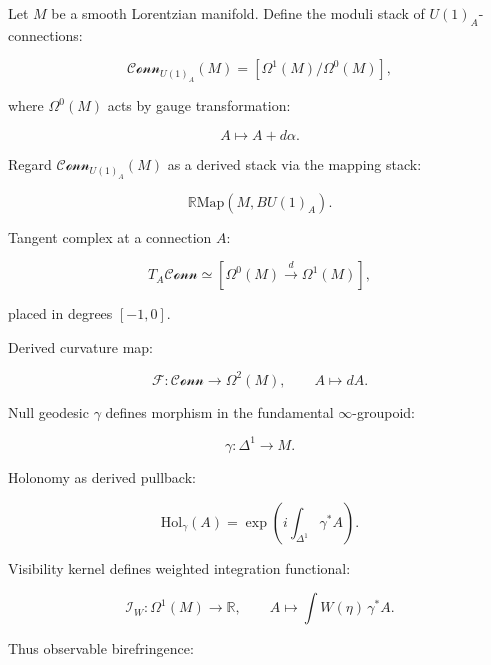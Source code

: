 \documentclass[12pt]{article}
\begin{document}
Let $M$ be a smooth Lorentzian manifold.
Define the moduli stack of $U(1)_A$-connections:

\begin{equation}
\mathcal{Conn}_{U(1)_A}(M)
=
\left[
\Omega^1(M)
\Big/
\Omega^0(M)
\right],
\end{equation}

where $\Omega^0(M)$ acts by gauge transformation:

\begin{equation}
A \mapsto A + d\alpha.
\end{equation}

Regard $\mathcal{Conn}_{U(1)_A}(M)$ as a derived stack via the mapping stack:

\begin{equation}
\mathbb{R}\mathrm{Map}(M, B U(1)_A).
\end{equation}

Tangent complex at a connection $A$:

\begin{equation}
T_A
\mathcal{Conn}
\simeq
\left[
\Omega^0(M)
\xrightarrow{d}
\Omega^1(M)
\right],
\end{equation}

placed in degrees $[-1,0]$.

Derived curvature map:

\begin{equation}
\mathcal{F}:
\mathcal{Conn}
\to
\Omega^2(M),
\qquad
A \mapsto dA.
\end{equation}

Null geodesic $\gamma$ defines morphism in the fundamental $\infty$-groupoid:

\begin{equation}
\gamma: \Delta^1 \to M.
\end{equation}

Holonomy as derived pullback:

\begin{equation}
\mathrm{Hol}_\gamma(A)
=
\exp
\left(
i \int_{\Delta^1}
\gamma^\ast A
\right).
\end{equation}

Visibility kernel defines weighted integration functional:

\begin{equation}
\mathcal{I}_W:
\Omega^1(M)
\to
\mathbb{R},
\qquad
A \mapsto
\int W(\eta)\, \gamma^\ast A.
\end{equation}

Thus observable birefringence:
\end{document}
